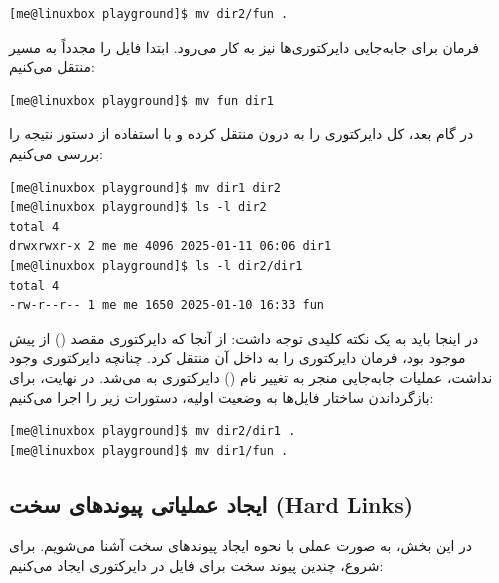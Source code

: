 \begin{latin}
\begin{lstlisting}
[me@linuxbox playground]$ mv dir2/fun .
\end{lstlisting}
\end{latin}

فرمان  برای جابه‌جایی دایرکتوری‌ها نیز به کار می‌رود. ابتدا فایل  را مجدداً به مسیر  منتقل می‌کنیم:

\begin{latin}
\begin{lstlisting}
[me@linuxbox playground]$ mv fun dir1
\end{lstlisting}
\end{latin}

در گام بعد، کل دایرکتوری  را به درون  منتقل کرده و با استفاده از دستور  نتیجه را بررسی می‌کنیم:

\begin{latin}
\begin{lstlisting}
[me@linuxbox playground]$ mv dir1 dir2
[me@linuxbox playground]$ ls -l dir2
total 4
drwxrwxr-x 2 me me 4096 2025-01-11 06:06 dir1
[me@linuxbox playground]$ ls -l dir2/dir1
total 4
-rw-r--r-- 1 me me 1650 2025-01-10 16:33 fun
\end{lstlisting}
\end{latin}

در اینجا باید به یک نکته کلیدی توجه داشت: از آنجا که دایرکتوری مقصد () از پیش موجود بود، فرمان  دایرکتوری  را به داخل آن منتقل کرد. چنانچه دایرکتوری  وجود نداشت، عملیات جابه‌جایی منجر به تغییر نام () دایرکتوری  به  می‌شد. در نهایت، برای بازگرداندن ساختار فایل‌ها به وضعیت اولیه، دستورات زیر را اجرا می‌کنیم:

\begin{latin}
\begin{lstlisting}
[me@linuxbox playground]$ mv dir2/dir1 .
[me@linuxbox playground]$ mv dir1/fun .
\end{lstlisting}
\end{latin}

\subsection{ایجاد عملیاتی پیوندهای سخت (Hard Links)}

در این بخش، به صورت عملی با نحوه ایجاد پیوندهای سخت آشنا می‌شویم. برای شروع، چندین پیوند سخت برای فایل  در دایرکتوری  ایجاد می‌کنیم:

